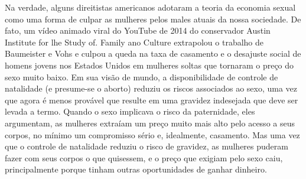 Na verdade, alguns direitistas americanos adotaram a teoria da economia sexual como uma forma de culpar as mulheres pelos males atuais da nossa sociedade. De fato, um vídeo animado viral do YouTube de 2014 do conservador Austin Institute for lhe Study of. Family ano Culture extrapolou o trabalho de Baumeister e Vohs e culpou a queda na taxa de casamento e o desajuste social de homens jovens nos Estados Unidos em mulheres soltas que tornaram o preço do sexo muito baixo. Em sua visão de mundo, a disponibilidade de controle de natalidade (e presume-se o aborto) reduziu os riscos associados ao sexo, uma vez que agora é menos provável que resulte em uma gravidez indesejada que deve ser levada a termo. Quando o sexo implicava o risco da paternidade, eles argumentam, as mulheres extraíam um preço muito mais alto pelo acesso a seus corpos, no mínimo um compromisso sério e, idealmente, casamento. Mas uma vez que o controle de natalidade reduziu o risco de gravidez, as mulheres puderam fazer com seus corpos o que quisessem, e o preço que exigiam pelo sexo caiu, principalmente porque tinham outras oportunidades de ganhar dinheiro.
 \par 

